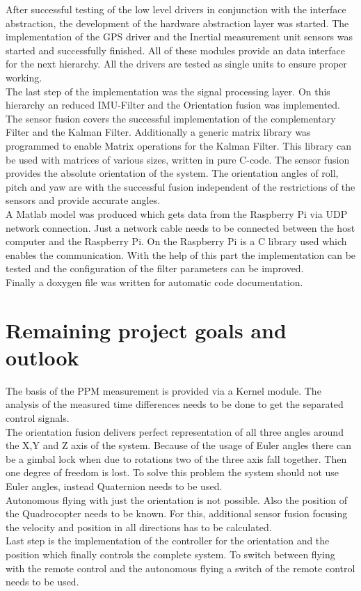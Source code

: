 After successful testing of the low level drivers in conjunction with the interface abstraction, the development of the hardware abstraction layer was started. The implementation of the GPS driver and the Inertial measurement unit sensors was started and successfully finished. All of these modules provide an data interface for the next hierarchy. All the drivers are tested as single units to ensure proper working.\\
The last step of the implementation was the signal processing layer. On this hierarchy an reduced IMU-Filter and the Orientation fusion was implemented.\\
The sensor fusion covers the successful implementation of the complementary Filter and the Kalman Filter. Additionally a generic matrix library was programmed to enable Matrix operations for the Kalman Filter. This library can be used with matrices of various sizes, written in pure C-code. The sensor fusion provides the absolute orientation of the system. The orientation angles of roll, pitch and yaw are with the successful fusion independent of the restrictions of the sensors and provide accurate angles.\\
A Matlab model was produced which gets data from the Raspberry Pi via UDP network connection. Just a network cable needs to be connected between the host computer and the Raspberry Pi. On the Raspberry Pi is a C library used which enables the communication. With the help of this part the implementation can be tested and the configuration of the filter parameters can be improved.\\
Finally a doxygen file was written for automatic code documentation.

\section{Remaining project goals and outlook}
\label{sec:conclusion:outlook}

The basis of the PPM measurement is provided via a Kernel module. The analysis of the measured time differences needs to be done to get the separated control signals.\\
The orientation fusion delivers perfect representation of all three angles around the X,Y and Z axis of the system. Because of the usage of Euler angles there can be a gimbal lock when due to rotations two of the three axis fall together. Then one degree of freedom is lost. To solve this problem the system should not use Euler angles, instead Quaternion needs to be used.\\
Autonomous flying with just the orientation is not possible. Also the position of the Quadrocopter needs to be known. For this, additional sensor fusion focusing the velocity and position in all directions has to be calculated.\\
Last step is the implementation of the controller for the orientation and the position which finally controls the complete system. To switch between flying with the remote control and the autonomous flying a switch of the remote control needs to be used.